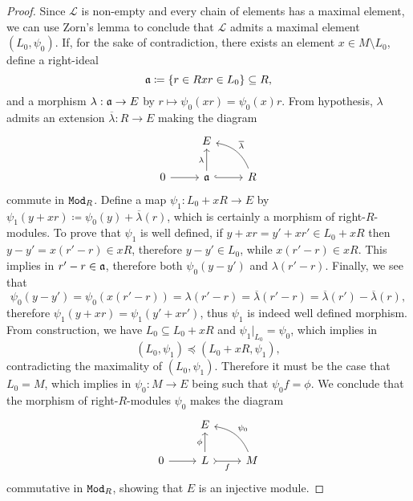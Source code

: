 \begin{proof}
    Since \(\mathcal{L}\) is non-empty and every chain of elements has a maximal
    element, we can use Zorn's lemma to conclude that \(\mathcal{L}\) admits a
    maximal element \((L_0, \psi_0)\). If, for the sake of contradiction, there
    exists an element \(x \in M \setminus L_0\), define a right-ideal
    \[
        \mathfrak{a} \coloneq \{r \in R \relax x r \in L_0\} \subseteq R,
    \]
    and a morphism \(\lambda: \mathfrak{a} \to E\) by
    \(r \mapsto \psi_0(x r) = \psi_0(x) r\). From hypothesis, \(\lambda\) admits an
    extension \(\overline{\lambda}: R \to E\) making the diagram
    \[
        \begin{tikzcd}
            &E &
            \\
            0 \ar[r] &\ideal a \ar[u, "\lambda"] \ar[r, hook]
            &R \ar[lu, "\overline{\lambda}"', bend right]
        \end{tikzcd}
    \]
    commute in \({\texttt{Mod}_{R}}\). Define a map \(\psi_1: L_0 + x R \to E\) by
    \(\psi_1(y + x r) \coloneq \psi_0(y) + \overline{\lambda}(r)\), which is
    certainly a morphism of right-\(R\)-modules. To prove that \(\psi_1\) is well
    defined, if \(y + x r = y' + x r' \in L_0 + x R\) then
    \(y - y' = x(r' - r) \in x R\), therefore \(y - y' \in L_0\), while
    \(x (r' - r) \in x R\). This implies in \(r' - r \in \mathfrak{a}\), therefore both
    \(\psi_0(y - y')\) and \(\lambda(r' - r)\). Finally, we see that
    \[
        \psi_0(y - y')
        = \psi_0(x (r' - r))
        = \lambda(r' - r)
        = \overline{\lambda}(r' - r)
        = \overline{\lambda}(r') - \overline{\lambda}(r),
    \]
    therefore \(\psi_1(y + x r) = \psi_1(y' + x r')\), thus \(\psi_1\) is indeed
    well defined morphism. From construction, we have \(L_0 \subseteq L_0 + x R\)
    and \(\psi_1|_{L_0} = \psi_0\), which implies in
    \[
        (L_0, \psi_1) \preceq (L_0 + x R, \psi_1),
    \]
    contradicting the maximality of \((L_0, \psi_1)\). Therefore it must be the case
    that \(L_0 = M\), which implies in \(\psi_0: M \to E\) being such that
    \(\psi_0 f = \phi\). We conclude that the morphism of right-\(R\)-modules
    \(\psi_0\) makes the diagram
    \[
        \begin{tikzcd}
            &E &
            \\
            0 \ar[r] &L \ar[u, "\phi"] \ar[r, tail, "f"']
            &M \ar[lu, "\psi_0"', bend right]
        \end{tikzcd}
    \]
    commutative in \({\texttt{Mod}_{R}}\), showing that \(E\) is an injective module.
\end{proof}

